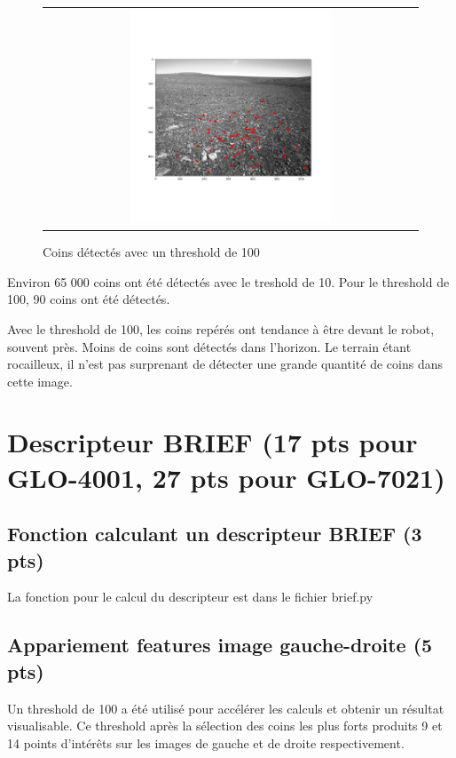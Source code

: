 \documentclass[12pt]{article}
\begin{document}
\begin{figure}[ht]
 \begin{center}
  \begin{tabular}{c}
    \includegraphics[width=0.55\textwidth]{q4-detection-keypoint.png}
  \end{tabular}
 \end{center}
\vspace{-0.25in}
 \caption{Coins d\'etect\'es avec un threshold de 100}
    \label{detection-coin-100}
\end{figure}

Environ 65 000 coins ont \'et\'e d\'etect\'es avec le treshold de 10.
Pour le threshold de 100, 90 coins ont \'et\'e d\'etect\'es.

Avec le threshold de 100, les coins rep\'er\'es ont tendance \`a \^etre devant le robot, souvent pr\`es.
Moins de coins sont d\'etect\'es dans l'horizon.
Le terrain étant rocailleux, il n'est pas surprenant de détecter une grande quantité de coins dans cette image.

\newpage
\section{Descripteur BRIEF (17 pts pour GLO-4001, 27 pts pour GLO-7021)}

\subsection{Fonction calculant un descripteur BRIEF (3 pts)}
La fonction pour le calcul du descripteur est dans le fichier brief.py

\subsection{Appariement features image gauche-droite (5 pts)}
Un threshold de 100 a été utilisé pour accélérer les calculs et obtenir un résultat visualisable.
Ce threshold après la sélection des coins les plus forts produits 9 et 14 points d'intérêts sur les images de gauche et de droite respectivement.
\end{document}
